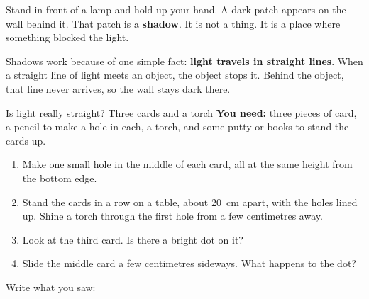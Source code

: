 \label{ch1}

Stand in front of a lamp and hold up your hand. A dark patch appears on the wall behind it. That patch is a \textbf{shadow}. It is not a thing. It is a place where something blocked the light.

Shadows work because of one simple fact: \textbf{light travels in straight lines}. When a straight line of light meets an object, the object stops it. Behind the object, that line never arrives, so the wall stays dark there.

\begin{center}
\end{center}

\begin{tryit}{Is light really straight? Three cards and a torch}
\textbf{You need:} three pieces of card, a pencil to make a hole in each, a torch, and some putty or books to stand the cards up.
\begin{enumerate}[leftmargin=1.6em]
\item Make one small hole in the middle of each card, all at the same height from the bottom edge.
\item Stand the cards in a row on a table, about 20~cm apart, with the holes lined up. Shine a torch through the first hole from a few centimetres away.
\item Look at the third card. Is there a bright dot on it?
\item Slide the middle card a few centimetres sideways. What happens to the dot?
\end{enumerate}
Write what you saw: \wline[6.5cm]
\end{tryit}

